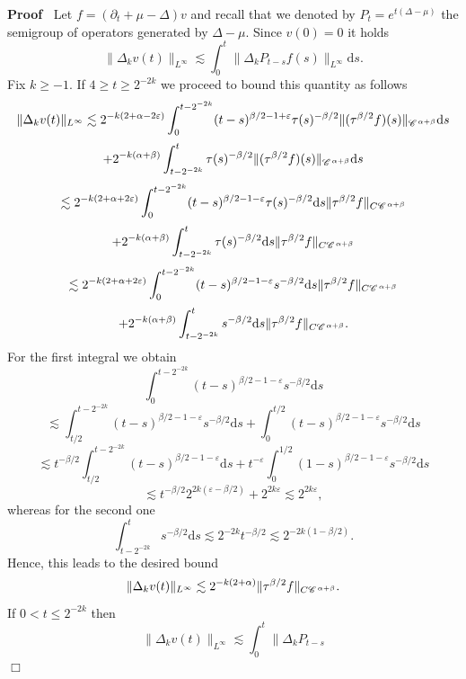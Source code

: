 \documentclass[a4paper,11pt]{article}
\newcommand{\mathd}{\mathrm{d}}
\newenvironment{proof}{\noindent\textbf{Proof\ }}{\hspace*{\fill}$\Box$\medskip}
\numberwithin{equation}{section}
\newcommand{\CC}{\mathscr{C} \hspace{.1em}}
\newcommand{\8}{\infty}
\begin{document}
\begin{proof}
  Let $f = (\partial_t + \mu - \Delta) v$ and recall that we denoted by $P_{t}=e^{t(\Delta-\mu)}$ the  semigroup of operators generated by $\Delta-\mu$. Since $v (0) = 0$ it holds
  \[ \| \Delta_k v (t) \|_{L^{\infty}} \lesssim \int_0^t \| \Delta_k P_{t - s}
     f (s) \|_{L^{\infty}} \mathd s. \]
  Fix $k \geqslant - 1$. If $4 \geqslant t \geqslant 2^{- 2 k}$ we proceed to
  bound this quantity as follows
  \[ \| \Delta_k v (t) \|_{L^{\infty}} \lesssim 2^{- k (2 + \alpha - 2
     \varepsilon)} \int_0^{t - 2^{- 2 k}} (t - s)^{\beta / 2 - 1 +
     \varepsilon} \tau (s)^{- \beta / 2} \| (\tau^{\beta / 2} f) (s)
     \|_{\CC^{\alpha + \beta}} \mathd s \]
  \[ + 2^{- k (\alpha + \beta)} \int_{t - 2^{- 2 k}}^t \tau (s)^{- \beta / 2}
     \| (\tau^{\beta / 2} f) (s) \|_{\CC^{\alpha + \beta}} \mathd s \]
  \[ \lesssim 2^{- k (2 + \alpha + 2 \varepsilon)} \int_0^{t - 2^{- 2 k}} (t -
     s)^{\beta / 2 - 1 - \varepsilon} \tau (s)^{- \beta / 2} \mathd s \|
     \tau^{\beta / 2} f\|_{C \CC^{\alpha + \beta}} \]
  \[ + 2^{- k (\alpha + \beta)} \int_{t - 2^{- 2 k}}^t \tau (s)^{- \beta / 2}
     \mathd s \| \tau^{\beta / 2} f\|_{C \CC^{\alpha + \beta}} \]
  \[ \lesssim 2^{- k (2 + \alpha + 2 \varepsilon)} \int_0^{t - 2^{- 2 k}} (t -
     s)^{\beta / 2 - 1 - \varepsilon} s^{- \beta / 2} \mathd s \| \tau^{\beta
     / 2} f\|_{C \CC^{\alpha + \beta}} \]
  \[ + 2^{- k (\alpha + \beta)} \int_{t - 2^{- 2 k}}^t s^{- \beta / 2} \mathd
     s \| \tau^{\beta / 2} f\|_{C \CC^{\alpha + \beta}} . \]
  For the first integral we obtain
  \[ \int_0^{t - 2^{- 2 k}} (t - s)^{\beta / 2 - 1 - \varepsilon} s^{- \beta /
     2} \mathd s \]
  \[ \lesssim \int_{t / 2}^{t - 2^{- 2 k}} (t - s)^{\beta / 2 - 1 -
     \varepsilon} s^{- \beta / 2} \mathd s + \int_0^{t / 2} (t - s)^{\beta / 2
     - 1 - \varepsilon} s^{- \beta / 2} \mathd s \]
  \[ \lesssim t^{- \beta / 2} \int_{t / 2}^{t - 2^{- 2 k}} (t - s)^{\beta / 2
     - 1 - \varepsilon} \mathd s + t^{- \varepsilon} \int_0^{1 / 2} (1 -
     s)^{\beta / 2 - 1 - \varepsilon} s^{- \beta / 2} \mathd s \]
  \[ \lesssim t^{- \beta / 2} 2^{2 k (\varepsilon - \beta / 2)} + 2^{2 k
     \varepsilon} \lesssim 2^{2 k \varepsilon}, \]
  whereas for the second one
  \[ \int_{t - 2^{- 2 k}}^t s^{- \beta / 2} \mathd s \lesssim 2^{- 2 k} t^{-
     \beta / 2} \lesssim 2^{- 2 k (1 - \beta / 2)} . \]
  Hence, this leads to the desired bound
  \[ \| \Delta_k v (t) \|_{L^{\infty}} \lesssim 2^{- k (2 + \alpha)} \|
     \tau^{\beta / 2} f\|_{C \CC^{\alpha + \beta}} . \]
  If $0 < t \leqslant 2^{- 2 k}$ then
  \[ \| \Delta_k v (t) \|_{L^{\infty}} \lesssim \int_0^t \| \Delta_k P_{t - s}
\]
\end{proof}
\end{document}
